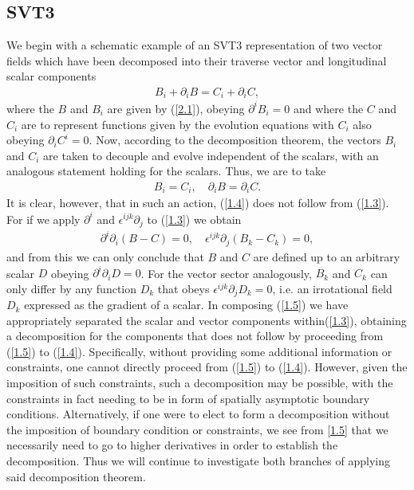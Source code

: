 \subsection{SVT3}
\label{ss:decomp_svt3_basis}
%
We begin with a schematic example of an SVT3 representation of two vector fields which have been decomposed into their traverse vector and longitudinal scalar components
\begin{eqnarray}
B_i+\partial_iB=C_i+\partial_iC,
\label{1.3}
\end{eqnarray}
%
where the $B$ and $B_i$ are given by (\ref{2.1}), obeying $\partial^i B_i = 0$ and where the $C$ and $C_i$ are to represent functions given by the evolution equations with $C_i$ also obeying  $\partial_iC^i=0$. Now, according to the decomposition theorem, the vectors $B_i$ and $C_i$ are taken to decouple and evolve independent of the scalars, with an analogous statement holding for the scalars. Thus, we are to take
%
\begin{eqnarray}
B_i= C_i,\quad \partial_iB=\partial_iC.
\label{1.4}
\end{eqnarray}
%
It is clear, however, that in such an action, (\ref{1.4}) does not follow from (\ref{1.3}). For if we apply $\partial^i$ and $\epsilon^{ijk}\partial_j$  to (\ref{1.3}) we obtain 
%
\begin{eqnarray}
\partial^i\partial_i(B-C)=0,\quad \epsilon^{ijk}\partial_j(B_k-C_k)=0,
\label{1.5}
\end{eqnarray}
%
and from this we can only conclude that $B$ and $C$ are defined up to an arbitrary scalar $D$ obeying $\partial^i\partial_iD=0$. For the vector sector analogously, $B_k$ and $C_k$ can only differ by any function $D_k$ that obeys $\epsilon^{ijk}\partial_jD_k=0$, i.e. an irrotational field $D_k$ expressed as the gradient of a scalar. In composing (\ref{1.5}) we have appropriately separated the scalar and vector components within(\ref{1.3}), obtaining a decomposition for the components that does not follow by proceeding from (\ref{1.5}) to (\ref{1.4}). Specifically, without providing some additional information or constraints, one cannot directly proceed from (\ref{1.5}) to (\ref{1.4}). However, given the imposition of such constraints, such a decomposition may be possible, with the constraints in fact needing to be in form of spatially asymptotic boundary conditions. Alternatively, if one were to elect to form a decomposition without the imposition of boundary condition or constraints, we see from \eqref{1.5} that we necessarily need to go to higher derivatives in order to establish the decomposition. Thus we will continue to investigate both branches of applying said decomposition theorem.

